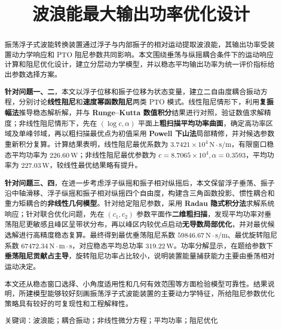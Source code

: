 \documentclass[UTF8,12pt,a4paper]{ctexart}
\title{\songti 波浪能最大输出功率优化设计}
\author{}
\date{}
\newcommand{\absbf}[1]{{\songti\bfseries #1}}
\begin{document}
\maketitle

\begin{abstract}
\songti
	振荡浮子式波能转换装置通过浮子与内部振子的相对运动提取波浪能，其输出功率受装置动力学响应和 PTO 阻尼参数共同影响。本文围绕垂荡与纵摇耦合条件下的运动响应计算和阻尼优化设计，建立分层动力学模型，并以稳态平均输出功率为统一评价指标给出参数选择方案。
	
	\absbf{针对问题一、二}，本文以浮子位移和振子位移为状态变量，建立二自由度耦合振动方程，分别讨论\absbf{线性阻尼}和\absbf{速度幂函数阻尼}两类 PTO 模式。线性阻尼情形下，利用\absbf{复振幅法}推导稳态解析解，并与 \absbf{Runge--Kutta 数值积分}结果进行对照，验证数值求解精度；非线性阻尼情形下，先在 $(\log c,\alpha)$ 平面上\absbf{粗扫描平均功率曲面}，确定高功率区域及单峰邻域，再以粗扫描最优点为初值采用 \absbf{Powell 下山法}局部精修，并对候选参数重新积分复算。计算结果表明，线性阻尼最优系数为 \absbf{$3.7421\times10^4\,\mathrm{N\cdot s/m}$}，有限窗口稳态平均功率为 \absbf{$226.60\,\mathrm{W}$}；非线性阻尼最优参数为 \absbf{$c=8.7065\times10^4,\alpha=0.3593$}，平均功率为 \absbf{$227.03\,\mathrm{W}$}，较线性最优结果略有提升。
	
	\absbf{针对问题三、四}，在进一步考虑浮子纵摇和振子相对纵摇后，本文保留浮子垂荡、振子沿中轴滑移、浮子纵摇和振子相对纵摇四个自由度，构建含三角函数投影、惯性耦合和重力矩耦合的\absbf{非线性几何模型}。针对给定阻尼参数，采用 \absbf{Radau 隐式积分法}求解系统响应；针对联合优化问题，先在 $(c_1,c_2)$ 参数平面作\absbf{二维粗扫描}，发现平均功率对垂荡阻尼更敏感且峰区呈带状分布，再以峰区内较优点启动\absbf{无导数局部优化}，并对最优候选解进行高精度稳态复算。最终得到最优垂荡阻尼系数 \absbf{$59846.67\,\mathrm{N\cdot s/m}$}、最优旋转阻尼系数 \absbf{$67472.34\,\mathrm{N\cdot m\cdot s}$}，对应稳态平均总功率 \absbf{$319.22\,\mathrm{W}$}。功率分解显示，在题给参数下\absbf{垂荡阻尼贡献占主导}，旋转阻尼功率占比较小，说明装置能量捕获能力主要由垂荡相对运动决定。
	
	本文还从稳态窗口选择、小角度适用性和几何有效范围等方面检验模型可靠性。结果说明，所建模型能够较好刻画振荡浮子式波能装置的主要动力学特征，所给阻尼参数优化策略具有较好的可复现性和工程解释性。
	

\songti 关键词：波浪能；耦合振动；非线性微分方程；平均功率；阻尼优化
\end{abstract}

\newpage








\end{document}
